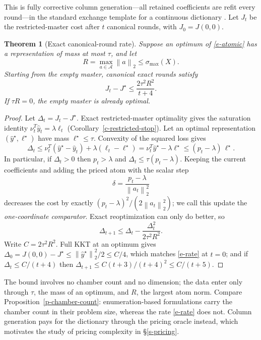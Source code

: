 \documentclass[12pt]{article}
\theoremstyle{plain}
\newtheorem{theorem}{Theorem}
\theoremstyle{definition}
\newcommand{\A}{\mathcal{A}}
\newcommand{\norm}[1]{\left\lVert #1\right\rVert}
\newcommand{\yhat}{\widehat y}
\begin{document}
This is fully corrective column generation---all retained coefficients are
refit every round---in the standard exchange template for a continuous
dictionary \citep{bach2017breaking,jaggi2013revisiting}. Let $J_t$ be the
restricted-master cost after $t$ canonical rounds, with $J_0=J(0,0)$.

\begin{theorem}[Exact canonical-round rate]\label{t-rate}
Suppose an optimum of \eqref{e-atomic} has a representation of mass at most
$\tau$, and let
\[
  R=\max_{a\in\A}\norm a_2\le\sigma_{\max}(X).
\]
Starting from the empty master, canonical exact rounds satisfy
\begin{equation}\label{e-rate}
  J_t-J^\star\le\frac{2\tau^2R^2}{t+4}.
\end{equation}
If $\tau R=0$, the empty master is already optimal.
\end{theorem}

\begin{proof}
Let $\Delta_t=J_t-J^\star$. Exact restricted-master optimality gives the
saturation identity $\nu_t^T\yhat_t=\lambda\ell_t$
(Corollary~\ref{c-restricted-stop}). Let an optimal representation
$(\yhat^\star,\ell^\star)$ have mass $\ell^\star\le\tau$. Convexity of the
squared loss gives
\begin{equation}\label{e-price-gap}
  \Delta_t
  \le\nu_t^T(\yhat^\star-\yhat_t)+\lambda(\ell_t-\ell^\star)
  =\nu_t^T\yhat^\star-\lambda\ell^\star
  \le(p_t-\lambda)\,\ell^\star .
\end{equation}
In particular, if $\Delta_t>0$ then $p_t>\lambda$ and
$\Delta_t\le\tau(p_t-\lambda)$. Keeping the current coefficients and adding
the priced atom with the scalar step
\[
  \delta=\frac{p_t-\lambda}{\norm{a_t}_2^2}
\]
decreases the cost by exactly $(p_t-\lambda)^2/(2\norm{a_t}_2^2)$; we call
this update the \emph{one-coordinate comparator}. Exact reoptimization can
only do better, so
\[
  \Delta_{t+1}\le\Delta_t-\frac{\Delta_t^2}{2\tau^2R^2}.
\]
Write $C=2\tau^2R^2$. Full KKT at an optimum gives
$\Delta_0=J(0,0)-J^\star\le\norm{\yhat^\star}_2^2/2\le C/4$, which matches
\eqref{e-rate} at $t=0$; and if $\Delta_t\le C/(t+4)$ then
$\Delta_{t+1}\le C(t+3)/(t+4)^2\le C/(t+5)$.
\end{proof}

The bound involves no chamber count and no dimension; the data enter only
through $\tau$, the mass of an optimum, and $R$, the largest atom norm.
Compare Proposition~\ref{p-chamber-count}: enumeration-based formulations
carry the chamber count in their problem size, whereas the rate
\eqref{e-rate} does not. Column generation pays for the dictionary through the pricing oracle
instead, which motivates the study of pricing complexity in
\S\ref{s-pricing}.
\end{document}
